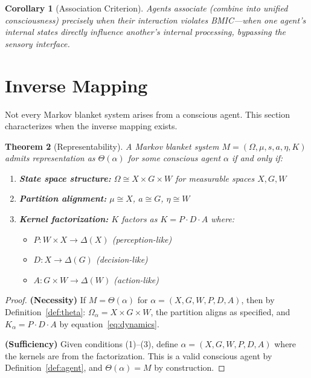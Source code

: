 \documentclass[11pt,a4paper]{article}
\newtheorem{theorem}{Theorem}[section]
\newtheorem{corollary}[theorem]{Corollary}
\begin{document}
\begin{corollary}[Association Criterion]\label{cor:association}
Agents \emph{associate} (combine into unified consciousness) precisely when their interaction violates BMIC---when one agent's internal states directly influence another's internal processing, bypassing the sensory interface.
\end{corollary}

\section{Inverse Mapping}\label{sec:inverse}

Not every Markov blanket system arises from a conscious agent. This section characterizes when the inverse mapping exists.

\begin{theorem}[Representability]\label{thm:inverse}
A Markov blanket system $M = (\Omega, \mu, s, a, \eta, K)$ admits representation as $\Theta(\alpha)$ for some conscious agent $\alpha$ if and only if:
\begin{enumerate}[nosep]
    \item \textbf{State space structure:} $\Omega \cong X \times G \times W$ for measurable spaces $X, G, W$
    \item \textbf{Partition alignment:} $\mu \cong X$, $a \cong G$, $\eta \cong W$
    \item \textbf{Kernel factorization:} $K$ factors as $K = P \cdot D \cdot A$ where:
    \begin{itemize}[nosep]
        \item $P : W \times X \to \Delta(X)$ (perception-like)
        \item $D : X \to \Delta(G)$ (decision-like)
        \item $A : G \times W \to \Delta(W)$ (action-like)
    \end{itemize}
\end{enumerate}
\end{theorem}

\begin{proof}
\textbf{(Necessity)} If $M = \Theta(\alpha)$ for $\alpha = (X, G, W, P, D, A)$, then by Definition~\ref{def:theta}: $\Omega_\alpha = X \times G \times W$, the partition aligns as specified, and $K_\alpha = P \cdot D \cdot A$ by equation~\eqref{eq:dynamics}.

\textbf{(Sufficiency)} Given conditions (1)--(3), define $\alpha = (X, G, W, P, D, A)$ where the kernels are from the factorization. This is a valid conscious agent by Definition~\ref{def:agent}, and $\Theta(\alpha) = M$ by construction.
\end{proof}
\end{document}
